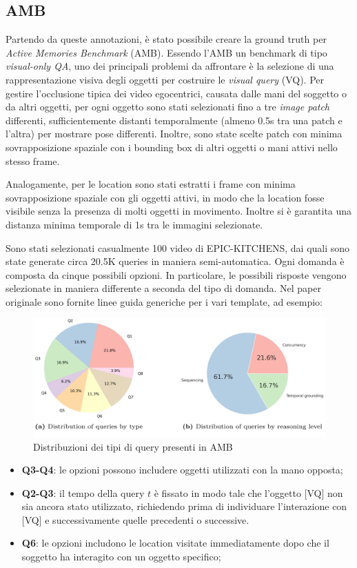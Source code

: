 \subsection*{AMB}
Partendo da queste annotazioni, è stato possibile creare la ground truth per \emph{Active Memories Benchmark} (AMB). Essendo l'AMB un benchmark di tipo \emph{visual-only QA}, uno dei principali problemi da affrontare è la selezione di una rappresentazione visiva degli oggetti per costruire le \emph{visual query} (VQ). Per gestire l'occlusione tipica dei video egocentrici, causata dalle mani del soggetto o da altri oggetti, per ogni oggetto sono stati selezionati fino a tre \emph{image patch} differenti, sufficientemente distanti temporalmente (almeno 0.5s tra una patch e l'altra) per mostrare pose differenti. Inoltre, sono state scelte patch con minima sovrapposizione spaziale con i bounding box di altri oggetti o mani attivi nello stesso frame.

Analogamente, per le location sono stati estratti i frame con minima sovrapposizione spaziale con gli oggetti attivi, in modo che la location fosse visibile senza la presenza di molti oggetti in movimento. Inoltre si è garantita una distanza minima temporale di 1s tra le immagini selezionate.  

Sono stati selezionati casualmente 100 video di EPIC-KITCHENS, dai quali sono state generate circa 20.5K queries in maniera semi-automatica. Ogni domanda è composta da cinque possibili opzioni. In particolare, le possibili risposte vengono selezionate in maniera differente a seconda del tipo di domanda. Nel paper originale sono fornite linee guida generiche per i vari template, ad esempio:

\begin{figure}[ht]
    \centering
    \includegraphics[width=0.7\linewidth]{Images/amb_stats.png}
    \caption{Distribuzioni dei tipi di query presenti in AMB}
    \label{fig:amb_stats0}
\end{figure}

\begin{itemize}
    \item \textbf{Q3-Q4}: le opzioni possono includere oggetti utilizzati con la mano opposta;
    \item \textbf{Q2-Q3}: il tempo della query $t$ è fissato in modo tale che l'oggetto [VQ] non sia ancora stato utilizzato, richiedendo prima di individuare l'interazione con [VQ] e successivamente quelle precedenti o successive.
    \item \textbf{Q6}: le opzioni includono le location visitate immediatamente dopo che il soggetto ha interagito con un oggetto specifico;
\end{itemize}


